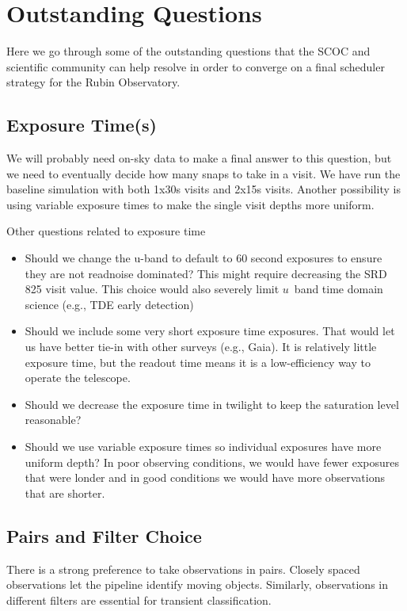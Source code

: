 
\section{Outstanding Questions}\label{sec:questions}

Here we go through some of the outstanding questions that the SCOC and scientific community can help resolve in order to converge on a final scheduler strategy for the Rubin Observatory. 

\subsection{Exposure Time(s)}

We will probably need on-sky data to make a final answer to this question, but we need to eventually decide how many snaps to take in a visit. We have run the baseline simulation with both 1x30s visits and 2x15s visits. Another possibility is using variable exposure times to make the single visit depths more uniform.

Other questions related to exposure time
\begin{itemize}
    \item{Should we change the u-band to default to 60 second exposures to ensure they are not readnoise dominated? This might require decreasing the SRD 825 visit value. This choice would also severely limit $u$\ band time domain science (e.g., TDE early detection)}
    \item{Should we include some very short exposure time exposures. That would let us have better tie-in with other surveys (e.g., Gaia).  It is relatively little exposure time, but the readout time means it is a low-efficiency way to operate the telescope.}
    \item{Should we decrease the exposure time in twilight to keep the saturation level reasonable?}
    \item{Should we use variable exposure times so individual exposures have more uniform depth? In poor observing conditions, we would have fewer exposures that were londer and in good conditions we would have more observations that are shorter.}
\end{itemize}


\subsection{Pairs and Filter Choice}

There is a strong preference to take observations in pairs. Closely spaced observations let the pipeline identify moving objects. Similarly, observations in different filters are essential for transient classification. 

